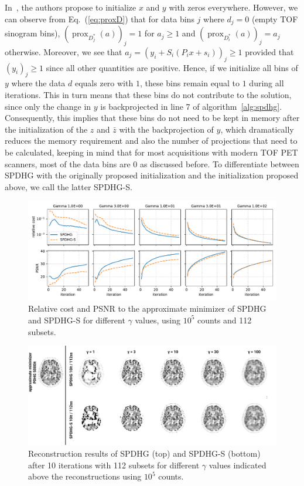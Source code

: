 \documentclass[11pt,twocolumn,twoside]{article}
\DeclareMathOperator{\prox}{prox}
\begin{document}
In~\cite{Ehrhardt2019}, the authors propose to initialize $x$ and $y$ with zeros everywhere.
However, we can observe from Eq.~(\ref{eq:proxD}) that for data bins $j$ where $d_j = 0$ 
(empty TOF sinogram bins), 
$(\prox_{D_j^*}(a))_j = 1$ for $a_j \geq 1$ and $(\prox_{D_i^*}(a))_j = a_j$ otherwise. 
Moreover, we see that $ a_j = (y_i + S_i (P_i x + s_i) )_j \geq 1$ provided that $(y_i)_j \geq 1$ 
since all other quantities are positive. 
Hence, if we initialize all bins of $y$ where the data $d$ equals zero with $1$, 
these bins remain equal to $1$ during all iterations. 
This in turn means that these bins do not contribute to the solution, since only the change
in $y$ is backprojected in line 7 of algorithm~\ref{alg:spdhg}.
Consequently, this implies that these bins do not need to be kept in memory after the initialization
of the $z$ and $\bar{z}$ with the backprojection of $y$, which dramatically reduces the memory
requirement and also the number of projections that need to be calculated, keeping in mind that
for most acquisitions with modern TOF PET scanners, most of the data bins are 0 as discussed before.
To differentiate between SPDHG with the originally proposed initialization and the initialization proposed
above, we call the latter SPDHG-S.

\begin{figure}
  \centering
  \includegraphics[width=1.0\textwidth]{./figs/brain2d_counts_1_0E+05_beta_6_0E-01_niter_5000_50_nsub_112_metrics.pdf}
  \caption{Relative cost and PSNR to the approximate minimizer of SPDHG and SPDHG-S for different
           $\gamma$ values, using $10^5$ counts and 112 subsets.}
  \label{fig:metrics}
\end{figure}

\begin{figure}
  \centering
  \includegraphics[width=1.0\textwidth]{./figs/fig2_recons_10_iterations.png}
  \caption{Reconstruction results of SPDHG (top) and SPDHG-S (bottom) after 10 iterations with
           112 subsets for different $\gamma$ values indicated above the reconstructions 
           using $10^5$ counts.}
  \label{fig:gamma}
\end{figure}
\end{document}
